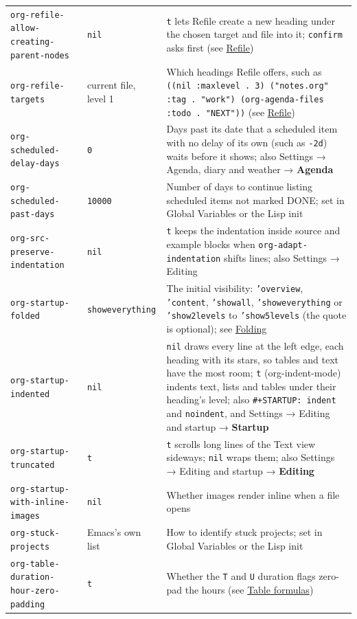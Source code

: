 \documentclass[11pt]{article}
\begin{document}
\begin{center}
\begin{tabular}{lll}
\texttt{org-refile-allow-creating-parent-nodes} & \texttt{nil} & \texttt{t} lets Refile create a new heading under the chosen target and file into it; \texttt{confirm} asks first (see \hyperref[sec:orgf424d46]{Refile})\\[0pt]
\texttt{org-refile-targets} & current file, level 1 & Which headings Refile offers, such as \texttt{((nil :maxlevel . 3) ("notes.org" :tag . "work") (org-agenda-files :todo . "NEXT"))} (see \hyperref[sec:orgf424d46]{Refile})\\[0pt]
\texttt{org-scheduled-delay-days} & \texttt{0} & Days past its date that a scheduled item with no delay of its own (such as \texttt{-2d}) waits before it shows; also Settings → Agenda, diary and weather → \textbf{Agenda}\\[0pt]
\texttt{org-scheduled-past-days} & \texttt{10000} & Number of days to continue listing scheduled items not marked DONE; set in Global Variables or the Lisp init\\[0pt]
\texttt{org-src-preserve-indentation} & \texttt{nil} & \texttt{t} keeps the indentation inside source and example blocks when \texttt{org-adapt-indentation} shifts lines; also Settings → Editing\\[0pt]
\texttt{org-startup-folded} & \texttt{showeverything} & The initial visibility: \texttt{'overview}, \texttt{'content}, \texttt{'showall}, \texttt{'showeverything} or \texttt{'show2levels} to \texttt{'show5levels} (the quote is optional); see \hyperref[sec:org4faaf88]{Folding}\\[0pt]
\texttt{org-startup-indented} & \texttt{nil} & \texttt{nil} draws every line at the left edge, each heading with its stars, so tables and text have the most room; \texttt{t} (org-indent-mode) indents text, lists and tables under their heading's level; also \texttt{\#+STARTUP: indent} and \texttt{noindent}, and Settings → Editing and startup → \textbf{Startup}\\[0pt]
\texttt{org-startup-truncated} & \texttt{t} & \texttt{t} scrolls long lines of the Text view sideways; \texttt{nil} wraps them; also Settings → Editing and startup → \textbf{Editing}\\[0pt]
\texttt{org-startup-with-inline-images} & \texttt{nil} & Whether images render inline when a file opens\\[0pt]
\texttt{org-stuck-projects} & Emacs's own list & How to identify stuck projects; set in Global Variables or the Lisp init\\[0pt]
\texttt{org-table-duration-hour-zero-padding} & \texttt{t} & Whether the \texttt{T} and \texttt{U} duration flags zero-pad the hours (see \hyperref[sec:org7d24a5b]{Table formulas})\\[0pt]

\end{tabular}
\end{center}
\end{document}
